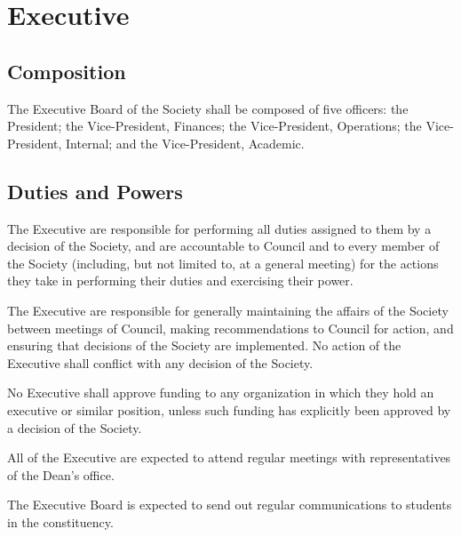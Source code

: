 \section{Executive}
\subsection{Composition}
The Executive Board of the Society shall be composed of five officers: the
President; the Vice-President, Finances; the Vice-President, Operations; the
Vice-President, Internal; and the Vice-President, Academic.

\subsection{Duties and Powers}
The Executive are responsible for performing all duties assigned to them by a
decision of the Society, and are accountable to Council and to every member of
the Society (including, but not limited to, at a general meeting) for the
actions they take in performing their duties and exercising their power.

The Executive are responsible for generally maintaining the affairs of the
Society between meetings of Council, making recommendations to Council for
action, and ensuring that decisions of the Society are implemented. No action of
the Executive shall conflict with any decision of the Society.

No Executive shall approve funding to any organization in which they hold an
executive or similar position, unless such funding has explicitly been approved
by a decision of the Society.

All of the Executive are expected to attend regular meetings with representatives of
the Dean’s office.

The Executive Board is expected to send out regular communications to students in
the constituency.

